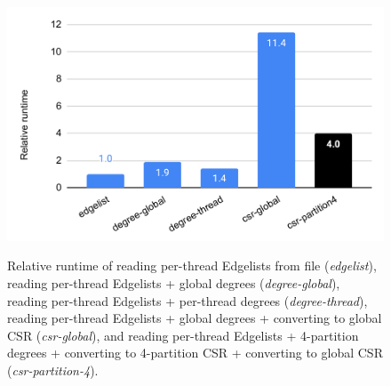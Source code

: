 \begin{figure}[hbtp]
  \centering
  \includegraphics[width=0.99\linewidth]{out/optimize-csr.pdf} \\[-2ex]
  \caption{Relative runtime of reading per-thread Edgelists from file (\textit{edgelist}), reading per-thread Edgelists + global degrees (\textit{degree-global}), reading per-thread Edgelists + per-thread degrees (\textit{degree-thread}), reading per-thread Edgelists + global degrees + converting to global CSR (\textit{csr-global}), and reading per-thread Edgelists + 4-partition degrees + converting to 4-partition CSR + converting to global CSR (\textit{csr-partition-4}).}
  \label{fig:optimize-csr}
\end{figure}
